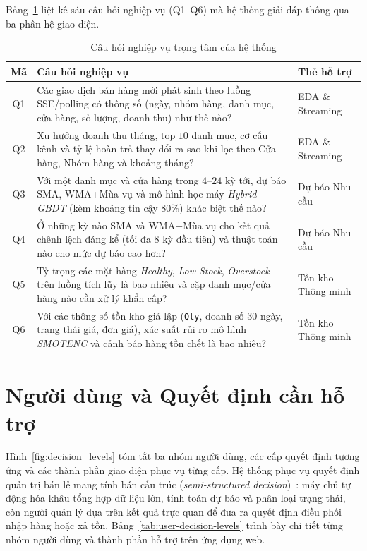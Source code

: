 \medskip

Bảng~\ref{tab:business-questions} liệt kê sáu câu hỏi nghiệp vụ (Q1--Q6) mà hệ thống giải đáp thông qua ba phân hệ giao diện.

\begin{table}[H]
	\centering
	\footnotesize
	\begin{tabular}{c p{11.5cm} p{3.5cm}}
		\toprule
		\textbf{Mã} & \textbf{Câu hỏi nghiệp vụ}                                                                                                                                                               & \textbf{Thẻ hỗ trợ} \\
		\midrule
		Q1          & Các giao dịch bán hàng mới phát sinh theo luồng SSE/polling có thông số (ngày, nhóm hàng, danh mục, cửa hàng, số lượng, doanh thu) như thế nào?                                          & EDA \& Streaming    \\
		Q2          & Xu hướng doanh thu tháng, top $10$ danh mục, cơ cấu kênh và tỷ lệ hoàn trả thay đổi ra sao khi lọc theo Cửa hàng, Nhóm hàng và khoảng tháng?                                             & EDA \& Streaming    \\
		Q3          & Với một danh mục và cửa hàng trong $4$--$24$ kỳ tới, dự báo SMA, WMA+Mùa vụ và mô hình học máy \textit{Hybrid GBDT} (kèm khoảng tin cậy $80\%$) khác biệt thế nào?                       & Dự báo Nhu cầu      \\
		Q4          & Ở những kỳ nào SMA và WMA+Mùa vụ cho kết quả chênh lệch đáng kể (tối đa $8$ kỳ đầu tiên) và thuật toán nào cho mức dự báo cao hơn?                                                       & Dự báo Nhu cầu      \\
		Q5          & Tỷ trọng các mặt hàng \textit{Healthy}, \textit{Low Stock}, \textit{Overstock} trên luồng tích lũy là bao nhiêu và cặp danh mục/cửa hàng nào cần xử lý khẩn cấp?                         & Tồn kho Thông minh  \\
		Q6          & Với các thông số tồn kho giả lập (\texttt{Qty}, doanh số $30$ ngày, trạng thái giá, đơn giá), xác suất rủi ro mô hình \textit{SMOTENC} và cảnh báo hàng tồn chết là bao nhiêu? & Tồn kho Thông minh  \\
		\bottomrule
	\end{tabular}
	\caption{Câu hỏi nghiệp vụ trọng tâm của hệ thống}
	\label{tab:business-questions}
\end{table}

\section{Người dùng và Quyết định cần hỗ trợ}
\label{sec:users}
Hình~\ref{fig:decision_levels} tóm tắt ba nhóm người dùng, các cấp quyết định tương ứng và các thành phần giao diện phục vụ từng cấp. Hệ thống phục vụ quyết định quản trị bán lẻ mang tính bán cấu trúc (\textit{semi-structured decision})~\cite{turban2010dsbi}: máy chủ tự động hóa khâu tổng hợp dữ liệu lớn, tính toán dự báo và phân loại trạng thái, còn người quản lý dựa trên kết quả trực quan để đưa ra quyết định điều phối nhập hàng hoặc xả tồn. Bảng~\ref{tab:user-decision-levels} trình bày chi tiết từng nhóm người dùng và thành phần hỗ trợ trên ứng dụng web.


